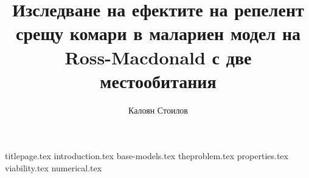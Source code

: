 \documentclass[bulgarian, 12pt]{article}
\title{Изследване на ефектите на репелент срещу комари в малариен модел на Ross-Macdonald с две местообитания}
\author{Калоян Стоилов}
\theoremstyle{definition}
\begin{document}
{titlepage.tex}
\tableofcontents
\thispagestyle{empty}
\newpage
\setcounter{page}{1}
{introduction.tex}
{base-models.tex}
{theproblem.tex}
{properties.tex}
{viability.tex}
{numerical.tex}
\pagebreak
\printbibliography[heading=bibintoc]
% 
% 
\end{document}

